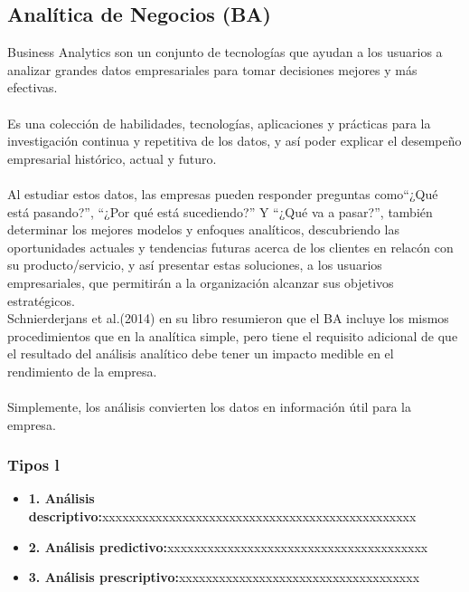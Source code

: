 \documentclass[preprint,12pt]{elsarticle}
\begin{document}
	\subsection{\textbf{Analítica de Negocios (BA) }}
	Business Analytics son un conjunto de tecnologías que ayudan a los usuarios a analizar grandes datos empresariales para tomar decisiones mejores y más efectivas. \\\\
Es una colección de habilidades, tecnologías, aplicaciones y prácticas para la investigación continua y repetitiva de los datos, y así poder explicar el desempeño empresarial histórico, actual y futuro\cite{referenciasosa1}.\\
\\Al estudiar estos datos, las empresas pueden responder preguntas como“¿Qué está pasando?”, “¿Por qué está sucediendo?” Y “¿Qué va a pasar?”\cite{referenciasosa3}, también determinar los mejores modelos y enfoques analíticos, descubriendo las oportunidades actuales y tendencias futuras acerca de los clientes en relacón con su producto/servicio, y así presentar estas soluciones, a los usuarios empresariales, que permitirán a la organización alcanzar sus objetivos estratégicos.\\
Schnierderjans et al.(2014) en su libro resumieron que el BA incluye los mismos procedimientos que en la analítica simple, pero tiene el requisito adicional de que el resultado del análisis analítico debe tener un impacto medible en el rendimiento de la empresa. \cite{referenciasosa2} \\
\\Simplemente, los análisis convierten los datos en información útil para la empresa.

	\subsubsection{\textbf{Tipos l}}
	\begin{itemize}
	\item{\textbf{1. Análisis descriptivo:}}xxxxxxxxxxxxxxxxxxxxxxxxxxxxxxxxxxxxxxxxxxxxxxx	
	\item {\textbf{2. Análisis  predictivo:}}xxxxxxxxxxxxxxxxxxxxxxxxxxxxxxxxxxxxxxx
	\item {\textbf{3. Análisis prescriptivo:}}xxxxxxxxxxxxxxxxxxxxxxxxxxxxxxxxxxxx
	\end{itemize}
\end{document}
